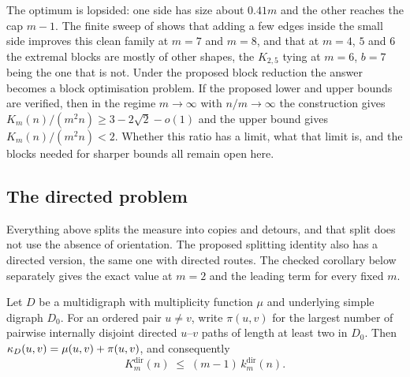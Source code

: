 The optimum is lopsided: one side has size about $0.41m$ and the other reaches
the cap $m-1$. The finite sweep of  shows that
adding a few edges inside the small side improves this clean family at $m = 7$
and $m = 8$, and that at $m = 4$, $5$ and $6$ the extremal blocks are mostly
of other shapes, the $K_{2,5}$ tying at $m = 6$, $b = 7$ being the one that is
not. Under the proposed block reduction the answer becomes a block optimisation
problem. If the proposed lower and upper bounds are verified, then in the regime
$m\to\infty$ with $n/m\to\infty$ the construction gives
$K_m(n)/(m^2n) \ge 3-2\sqrt2-o(1)$ and the upper bound gives
$K_m(n)/(m^2n)<2$. Whether this ratio has a limit, what that limit is, and
the blocks needed for sharper bounds all remain open here.

\subsection{The directed problem}\label{sec:multi-vertex-dir}

Everything above splits the measure into copies and detours, and that split does not
use the absence of orientation. The proposed splitting identity also has a directed version, the same one with
directed routes. The checked corollary below separately gives the exact value at
$m=2$ and the leading term for every fixed $m$.

\begin{conjecture}\label{lem:multi-vertex-split-dir}
Let $D$ be a multidigraph with multiplicity function $\mu$ and underlying simple
digraph $D_0$. For an ordered pair $u \ne v$, write $\pi(u,v)$ for the largest number
of pairwise internally disjoint directed $u$--$v$ paths of length at least two in
$D_0$. Then $\kappa_D(u,v) = \mu(u,v) + \pi(u,v)$, and consequently
\[
    K_m^{\mathrm{dir}}(n) \;\le\; (m-1)\,k_m^{\mathrm{dir}}(n) .
\]
\end{conjecture}

